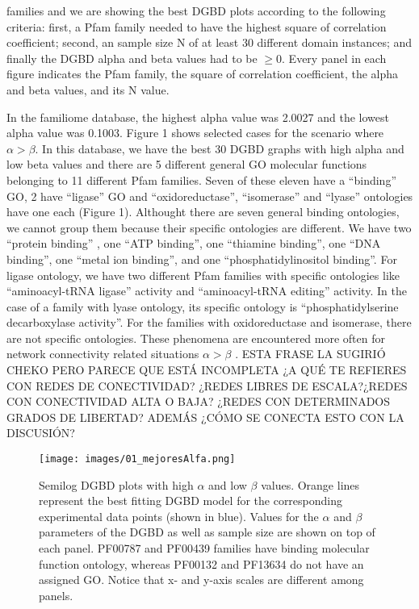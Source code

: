\documentclass[preprint,12pt]{elsarticle}
\begin{document}
families and we are showing the best DGBD plots according to the following criteria: first, a Pfam family needed to have the highest square of correlation coefficient; second, an sample size N of at least  30 different domain instances; and finally the DGBD alpha and beta values had to be $\ge 0$. Every panel in each figure indicates the Pfam family, the square of correlation coefficient, the alpha and beta values, and its N value. \par In the familiome database, the highest alpha value was 2.0027 and the lowest alpha value was 0.1003. Figure 1 shows selected cases for the scenario where $ \alpha > \beta$.  In this database, we have the best 30 DGBD graphs with high alpha and low beta values and there are 5 different general GO molecular functions belonging to 11 different Pfam families. Seven of these eleven have a ``binding'' GO, 2 have ``ligase'' GO and ``oxidoreductase'', ``isomerase'' and ``lyase'' ontologies have one each (Figure 1). Althought there are seven general binding ontologies, we cannot group them because their specific ontologies are different. We have two ``protein binding'' ,  one ``ATP binding'',  one ``thiamine binding'', one ``DNA binding'', one ``metal ion binding'', and one ``phosphatidylinositol binding''. For ligase ontology, we have two different Pfam families with specific ontologies like ``aminoacyl-tRNA ligase'' activity and ``aminoacyl-tRNA editing'' activity. In the case of a family with lyase ontology, its specific ontology is ``phosphatidylserine decarboxylase activity''. For the families with oxidoreductase and isomerase, there are not specific ontologies. 
These phenomena are encountered more often for network connectivity related situations $\alpha > \beta$ \cite{martinez2009universality}. ESTA FRASE LA SUGIRIÓ CHEKO PERO PARECE QUE ESTÁ INCOMPLETA ¿A QUÉ TE REFIERES CON REDES DE CONECTIVIDAD? ¿REDES LIBRES DE ESCALA?¿REDES CON CONECTIVIDAD ALTA O BAJA? ¿REDES CON DETERMINADOS GRADOS DE LIBERTAD? ADEMÁS ¿CÓMO SE CONECTA ESTO CON LA DISCUSIÓN?




\begin{figure} %
    \centering
    \texttt{[image: images/01\_mejoresAlfa.png]}
    \caption{Semilog DGBD plots with high $\alpha$ and low $\beta$ values.  Orange lines represent  the best fitting DGBD model for the corresponding experimental data points (shown in blue). Values for the $\alpha$ and $\beta$ parameters of the DGBD as well as sample size are shown on top of each panel. PF00787 and PF00439 families have binding molecular function ontology, whereas PF00132 and PF13634 do not have an assigned GO. Notice that  x- and y-axis scales are different among panels.}
    \label{fig:alpha}
\end{figure}
\clearpage
\end{document}
